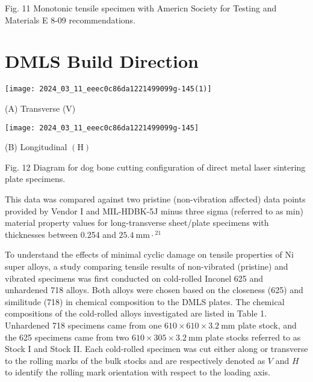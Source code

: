 \documentclass[10pt]{article}
\begin{document}
Fig. 11 Monotonic tensile specimen with Americn Society for Testing and Materials E 8-09 recommendations.

\section*{DMLS Build Direction}
\begin{center}
\texttt{[image: 2024\_03\_11\_eeec0c86da1221499099g-145(1)]}
\end{center}

(A) Transverse (V)

\begin{center}
\texttt{[image: 2024\_03\_11\_eeec0c86da1221499099g-145]}
\end{center}

(B) Longitudinal $(\mathrm{H})$

Fig. 12 Diagram for dog bone cutting configuration of direct metal laser sintering plate specimens.

This data was compared against two pristine (non-vibration affected) data points provided by Vendor I and MIL-HDBK-5J minus three sigma (referred to as min) material property values for long-transverse sheet/plate specimens with thicknesses between 0.254 and $25.4 \mathrm{~mm} \cdot{ }^{21}$

To understand the effects of minimal cyclic damage on tensile properties of Ni super alloys, a study comparing tensile results of non-vibrated (pristine) and vibrated specimens was first conducted on cold-rolled Inconel 625 and unhardened 718 alloys. Both alloys were chosen based on the closeness (625) and similitude (718) in chemical composition to the DMLS plates. The chemical compositions of the cold-rolled alloys investigated are listed in Table 1. Unhardened 718 specimens came from one $610 \times 610 \times 3.2 \mathrm{~mm}$ plate stock, and the 625 specimens came from two $610 \times 305 \times 3.2 \mathrm{~mm}$ plate stocks referred to as Stock I and Stock II. Each cold-rolled specimen was cut either along or transverse to the rolling marks of the bulk stocks and are respectively denoted as $V$ and $H$ to identify the rolling mark orientation with respect to the loading axis.
\end{document}
